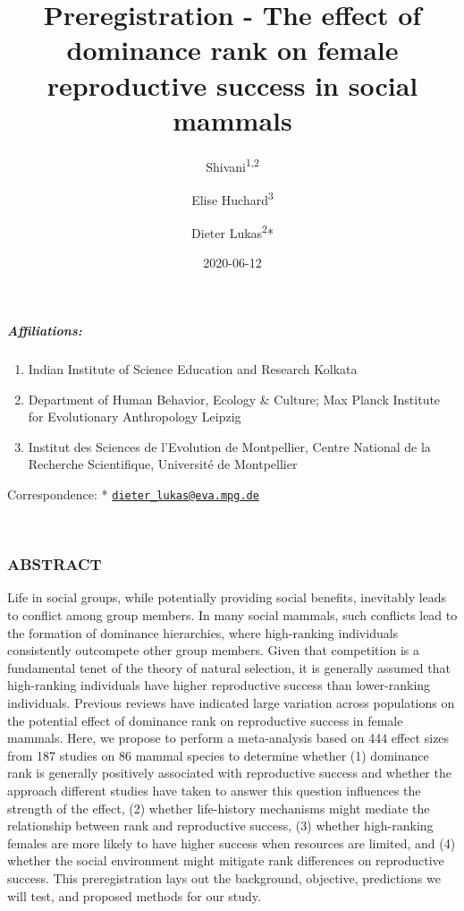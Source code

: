 \documentclass[]{article}
\title{Preregistration - The effect of dominance rank on female reproductive
success in social mammals}
\author{Shivani\textsuperscript{1,2} \and Elise Huchard\textsuperscript{3} \and Dieter Lukas\textsuperscript{2}*}
\date{2020-06-12}
\providecommand{\tightlist}{%
  \setlength{\itemsep}{0pt}\setlength{\parskip}{0pt}}
\let\oldsubparagraph\subparagraph
\renewcommand{\subparagraph}[1]{\oldsubparagraph{#1}\mbox{}}
\begin{document}
\maketitle

\hypertarget{affiliations}{%
\subparagraph{Affiliations:}\label{affiliations}}

\begin{enumerate}
\def\labelenumi{\arabic{enumi}.}
\tightlist
\item
  Indian Institute of Science Education and Research Kolkata
\item
  Department of Human Behavior, Ecology \& Culture; Max Planck Institute
  for Evolutionary Anthropology Leipzig
\item
  Institut des Sciences de l'Evolution de Montpellier, Centre National
  de la Recherche Scientifique, Université de Montpellier
\end{enumerate}

Correspondence: *
\href{mailto:dieter_lukas@eva.mpg.de}{\nolinkurl{dieter\_lukas@eva.mpg.de}}

~

\hypertarget{abstract}{%
\subsubsection{ABSTRACT}\label{abstract}}

Life in social groups, while potentially providing social benefits,
inevitably leads to conflict among group members. In many social
mammals, such conflicts lead to the formation of dominance hierarchies,
where high-ranking individuals consistently outcompete other group
members. Given that competition is a fundamental tenet of the theory of
natural selection, it is generally assumed that high-ranking individuals
have higher reproductive success than lower-ranking individuals.
Previous reviews have indicated large variation across populations on
the potential effect of dominance rank on reproductive success in female
mammals. Here, we propose to perform a meta-analysis based on 444 effect
sizes from 187 studies on 86 mammal species to determine whether (1)
dominance rank is generally positively associated with reproductive
success and whether the approach different studies have taken to answer
this question influences the strength of the effect, (2) whether
life-history mechanisms might mediate the relationship between rank and
reproductive success, (3) whether high-ranking females are more likely
to have higher success when resources are limited, and (4) whether the
social environment might mitigate rank differences on reproductive
success. This preregistration lays out the background, objective,
predictions we will test, and proposed methods for our study.
\end{document}
